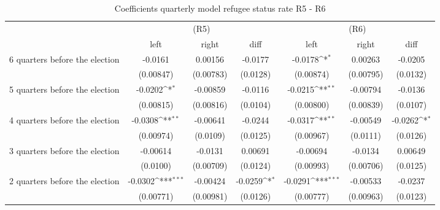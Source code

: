 \begin{table}[!ht]\centering \footnotesize
\def\sym#1{\ifmmode^{#1}\else\(^{#1}\)\fi}
\caption{Coefficients quarterly model refugee status rate R5 - R6}
\begin{tabular}{l*{6}{c}}
\hline\hline
                    &\multicolumn{3}{c}{(R5)}&\multicolumn{3}{c}{(R6)}\\
&\multicolumn{1}{c}{left}&\multicolumn{1}{c}{right}&\multicolumn{1}{c}{diff}&\multicolumn{1}{c}{left}&\multicolumn{1}{c}{right}&\multicolumn{1}{c}{diff}\\
\hline
 6 quarters before the election&     -0.0161         &     0.00156         &     -0.0177         &     -0.0178\sym{*}  &     0.00263         &     -0.0205         \\
                    &   (0.00847)         &   (0.00783)         &    (0.0128)         &   (0.00874)         &   (0.00795)         &    (0.0132)         \\
[0,5em]
 5 quarters before the election&     -0.0202\sym{*}  &    -0.00859         &     -0.0116         &     -0.0215\sym{**} &    -0.00794         &     -0.0136         \\
                    &   (0.00815)         &   (0.00816)         &    (0.0104)         &   (0.00800)         &   (0.00839)         &    (0.0107)         \\
[0,5em]
 4 quarters before the election&     -0.0308\sym{**} &    -0.00641         &     -0.0244         &     -0.0317\sym{**} &    -0.00549         &     -0.0262\sym{*}  \\
                    &   (0.00974)         &    (0.0109)         &    (0.0125)         &   (0.00967)         &    (0.0111)         &    (0.0126)         \\
[0,5em]
 3 quarters before the election&    -0.00614         &     -0.0131         &     0.00691         &    -0.00694         &     -0.0134         &     0.00649         \\
                    &    (0.0100)         &   (0.00709)         &    (0.0124)         &   (0.00993)         &   (0.00706)         &    (0.0125)         \\
[0,5em]
 2 quarters before the election&     -0.0302\sym{***}&    -0.00424         &     -0.0259\sym{*}  &     -0.0291\sym{***}&    -0.00533         &     -0.0237         \\
                    &   (0.00771)         &   (0.00981)         &    (0.0126)         &   (0.00777)         &   (0.00963)         &    (0.0123)         \\

\end{tabular}
\end{table}

